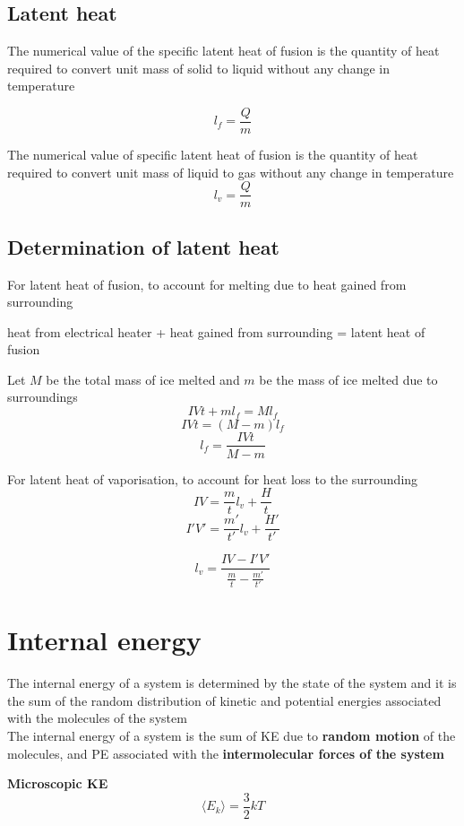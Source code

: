 \documentclass[a4paper, 10pt]{article}
\begin{document}
\subsection{Latent heat}
\begin{framed}
   The numerical value of the specific latent heat of fusion is the quantity of heat required to convert unit mass of solid to liquid without any change in temperature

   \[
   l_f = \frac{Q}{m}
   \]

   The numerical value of specific latent heat of fusion is the quantity of heat required to convert unit mass of liquid to gas without any change in temperature 
   \[
   l_v = \frac{Q}{m}
   \]
\end{framed}	

\subsection{Determination of latent heat}
For latent heat of fusion, to account for melting due to heat gained from surrounding
\begin{center}
   heat from electrical heater + heat gained from surrounding = latent heat of fusion 
\end{center}	
Let $M$  be the total mass of ice melted and $m$ be the mass of ice melted due to surroundings
\[
IV t + ml_f = Ml_f
\]
\[
   IV t = (M-m) l_f
\]
\[
l_f = \frac{IVt}{M-m}
\]

For latent heat of vaporisation, to account for heat loss to the surrounding
\[
IV = \frac{m}{t}l_v + \frac{H}{t}
\]
\[
I'V' = \frac{m'}{t'}l_v + \frac{H'}{t'}
\]

\[
l_v = \frac{IV - I'V'}{\frac{m}{t} - \frac{m'}{t'}}
\]

\section{Internal energy}
\begin{framed}
   The internal energy of a system is determined by the state of the system and it is the sum of the random distribution of kinetic and potential energies associated with the molecules of the system \\
   The internal energy of a system is the sum of KE due to \textbf{random motion} of the molecules, and PE associated with the \textbf{intermolecular forces of the system}
\end{framed}	

\textbf{Microscopic KE}
\[
   \langle E_k \rangle = \frac{3}{2}kT
\]
\end{document}

